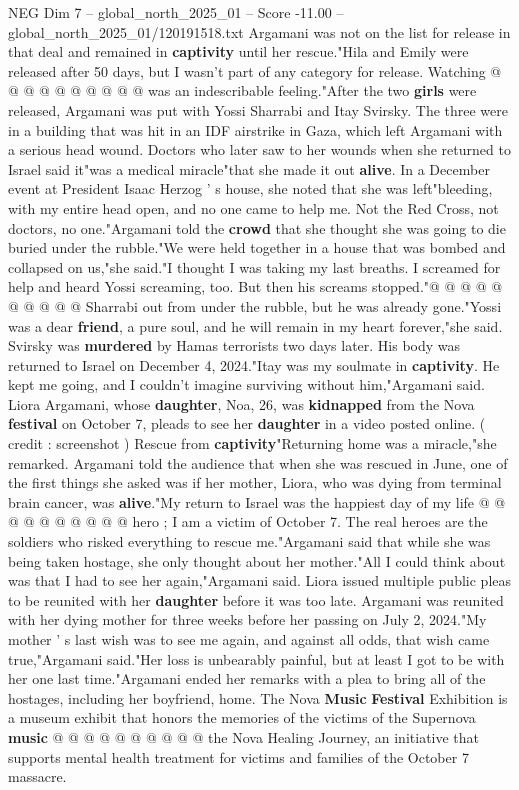 \begin{textsample}{NEG Dim 7 – global\_north\_2025\_01 – Score -11.00 – global\_north\_2025\_01/120191518.txt}
Argamani was not on the list for release in that deal and remained in \textbf{captivity} until her rescue."Hila and Emily were released after 50 days, but I wasn't part of any category for release.
Watching @ @ @ @ @ @ @ @ @ @ was an indescribable feeling."After the two \textbf{girls} were released, Argamani was put with Yossi Sharrabi and Itay Svirsky.
The three were in a building that was hit in an IDF airstrike in Gaza, which left Argamani with a serious head wound.
Doctors who later saw to her wounds when she returned to Israel said it"was a medical miracle"that she made it out \textbf{alive}.
In a December event at President Isaac Herzog ' s house, she noted that she was left"bleeding, with my entire head open, and no one came to help me.
Not the Red Cross, not doctors, no one."Argamani told the \textbf{crowd} that she thought she was going to die buried under the rubble."We were held together in a house that was bombed and collapsed on us,"she said."I thought I was taking my last breaths.
I screamed for help and heard Yossi screaming, too.
But then his screams stopped."@ @ @ @ @ @ @ @ @ @ Sharrabi out from under the rubble, but he was already gone."Yossi was a dear \textbf{friend}, a pure soul, and he will remain in my heart forever,"she said.
Svirsky was \textbf{murdered} by Hamas terrorists two days later.
His body was returned to Israel on December 4, 2024."Itay was my soulmate in \textbf{captivity}.
He kept me going, and I couldn't imagine surviving without him,"Argamani said.
Liora Argamani, whose \textbf{daughter}, Noa, 26, was \textbf{kidnapped} from the Nova \textbf{festival} on October 7, pleads to see her \textbf{daughter} in a video posted online. ( credit : screenshot ) Rescue from \textbf{captivity}"Returning home was a miracle,"she remarked.
Argamani told the audience that when she was rescued in June, one of the first things she asked was if her mother, Liora, who was dying from terminal brain cancer, was \textbf{alive}."My return to Israel was the happiest day of my life @ @ @ @ @ @ @ @ @ @ hero ; I am a victim of October 7.
The real heroes are the soldiers who risked everything to rescue me."Argamani said that while she was being taken hostage, she only thought about her mother."All I could think about was that I had to see her again,"Argamani said.
Liora issued multiple public pleas to be reunited with her \textbf{daughter} before it was too late.
Argamani was reunited with her dying mother for three weeks before her passing on July 2, 2024."My mother ' s last wish was to see me again, and against all odds, that wish came true,"Argamani said."Her loss is unbearably painful, but at least I got to be with her one last time."Argamani ended her remarks with a plea to bring all of the hostages, including her boyfriend, home.
The Nova \textbf{Music} \textbf{Festival} Exhibition is a museum exhibit that honors the memories of the victims of the Supernova \textbf{music} @ @ @ @ @ @ @ @ @ @ the Nova Healing Journey, an initiative that supports mental health treatment for victims and families of the October 7 massacre.

\end{textsample}
